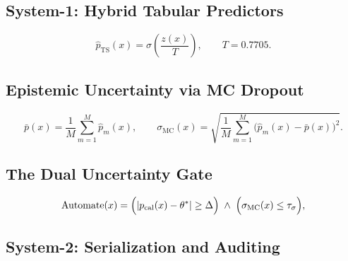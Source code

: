 \documentclass[sigconf,nonacm]{acmart}
\begin{document}
\subsection{System-1: Hybrid Tabular Predictors}
\begin{equation}
  \hat{p}_{\text{TS}}(x) = \sigma\!\left(\frac{z(x)}{T}\right), \qquad T = 0.7705.
\end{equation}

\subsection{Epistemic Uncertainty via MC Dropout}
\begin{equation}
  \bar{p}(x) = \frac{1}{M}\sum_{m=1}^{M}\hat{p}_m(x), \qquad
  \sigma_{\text{MC}}(x) = \sqrt{\frac{1}{M}\sum_{m=1}^{M}\bigl(\hat{p}_m(x) - \bar{p}(x)\bigr)^2}.
\end{equation}

\subsection{The Dual Uncertainty Gate}
\begin{equation}
  \text{Automate}(x) = \Bigl(\lvert p_{\text{cal}}(x) - \theta^* \rvert \ge \Delta\Bigr) \;\land\; \Bigl(\sigma_{\text{MC}}(x) \le \tau_{\sigma}\Bigr),
\end{equation}

\subsection{System-2: Serialization and Auditing}
\end{document}
